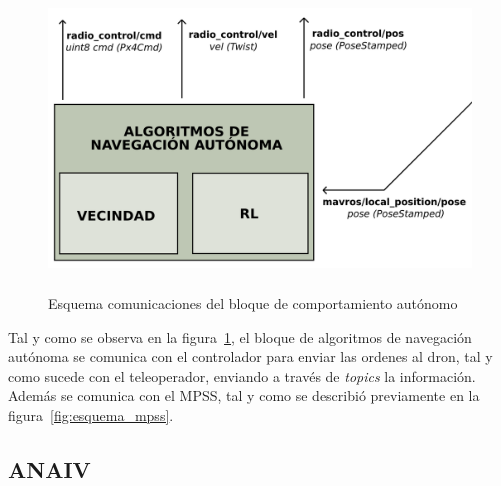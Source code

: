 \begin{figure} [t]
    \begin{center}
    \includegraphics[height=8cm]{imagenes/cap4/5_esquema_comp_auto.png}
    \end{center}
	\caption[Esquema comunicaciones del bloque de comportamiento autónomo]{Esquema comunicaciones del bloque de comportamiento autónomo}
	\label{fig:esquema_auto}
\end{figure}

Tal y como se observa en la figura~\ref{fig:esquema_auto}, el bloque de algoritmos de navegación autónoma se comunica con el controlador para enviar las ordenes al dron, tal y como sucede con el teleoperador, enviando a través de \emph{topics} la información. Además se comunica con el \ac{MPSS}, tal y como se describió previamente en la figura~\ref{fig:esquema_mpss}.

\subsection{\ac{ANAIV}}
\label{subsec:algoritmo_sf}

